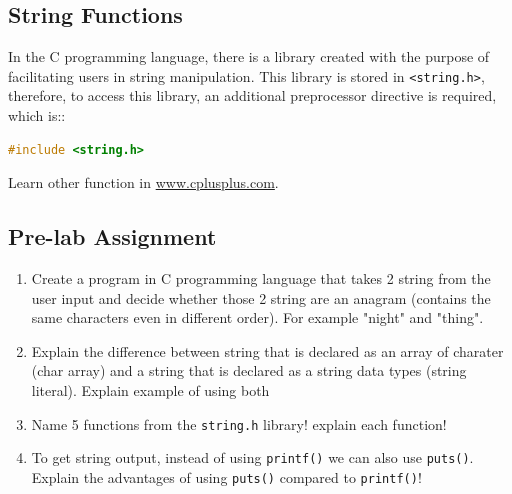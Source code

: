 \subsection{String Functions}

In the C programming language, there is a library created with the purpose of facilitating users in string manipulation. This library is stored in \verb|<string.h>|,
therefore, to access this library, an additional preprocessor directive is required, which is::
\begin{lstlisting}[language=c]
	#include <string.h>
\end{lstlisting}

Learn other function in \href{http://www.cplusplus.com/}{www.cplusplus.com}.

\subsection{Pre-lab Assignment}
\begin{enumerate}
	\item Create a program in C programming language that takes 2 string from the user input and decide whether those 2 string are an anagram (contains the same characters even in different order).
	      For example "night" and "thing".
	\item Explain the difference between string that is declared as an array of charater (char array) and a string that is declared as a string data types (string literal). Explain example of using both
	\item Name 5 functions from the \verb|string.h| library! explain each function!
	\item To get string output, instead of using \verb|printf()| we can also use \verb|puts()|. Explain the advantages of using \verb|puts()| compared to \verb|printf()|!
\end{enumerate}